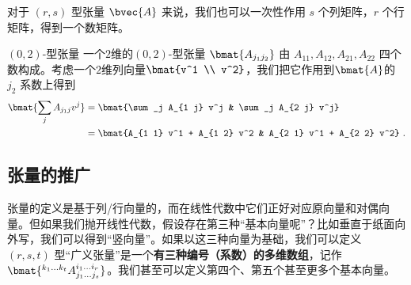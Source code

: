 对于 $(r, s)$ 型张量 $\bvec{A}$ 来说，我们也可以一次性作用 $s$ 个列矩阵，$r$ 个行矩阵，得到一个数矩阵。

\begin{example}{$(0, 2)$-型张量}
一个$2$维的$(0, 2)$-型张量 $\bmat{A_{j_1 j_2}}$ 由 $A_{1 1}, A_{1 2}, A_{2 1}, A_{2 2}$ 四个数构成。考虑一个$2$维列向量$\bmat{v^1 \\ v^2}$，我们把它作用到$\bmat{A}$的 $j_2$ 系数上得到
\begin{equation}
\begin{aligned}
\bmat{\sum_j A_{j_1 j} v^j} &= \bmat{\sum_j A_{1 j} v^j & \sum_j A_{2 j} v^j} \\
&= \bmat{A_{1 1} v^1 + A_{1 2} v^2 & A_{2 1} v^1 + A_{2 2} v^2}~.
\end{aligned}
\end{equation}

\end{example}


\subsection{张量的推广}

张量的定义是基于列/行向量的，而在线性代数中它们正好对应原向量和对偶向量。但如果我们抛开线性代数，假设存在第三种“基本向量呢”？比如垂直于纸面向外写，我们可以得到“竖向量”。如果以这三种向量为基础，我们可以定义 $(r, s, t)$ 型“广义张量”是一个\textbf{有三种编号（系数）的多维数组}，记作 $\bmat{{}^{k_1 \dots k_t}A_{j_1 \dots j_s}^{i_1 \dots i_r}}$。我们甚至可以定义第四个、第五个甚至更多个基本向量。

